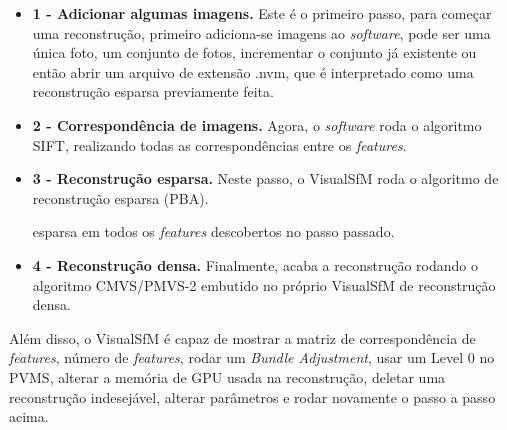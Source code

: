 \begin{itemize}
\item \textbf{1 - Adicionar algumas imagens.} Este é o primeiro passo, para começar uma reconstrução, primeiro adiciona-se imagens ao {\it software}, pode ser uma única foto, um conjunto de fotos, incrementar o conjunto já existente ou então abrir um arquivo de extensão .nvm, que é interpretado como uma reconstrução esparsa previamente feita.

\item \textbf{2 - Correspondência de imagens.} Agora, o {\it software} roda o algoritmo SIFT, realizando todas as correspondências entre os {\it features}.

\item \textbf{3 - Reconstrução esparsa.} Neste passo, o VisualSfM roda o algoritmo de reconstrução esparsa (PBA). %

esparsa em todos os {\it features} descobertos no passo passado.

\item \textbf{4 - Reconstrução densa.} Finalmente, acaba a reconstrução rodando o algoritmo CMVS/PMVS-2 embutido no próprio VisualSfM de reconstrução densa.
\end{itemize}



Além disso, o VisualSfM é capaz de mostrar a matriz de correspondência de {\it features}, número de {\it features}, rodar um {\it Bundle Adjustment}, usar um Level 0 no PVMS, alterar a memória de GPU usada na reconstrução, deletar uma reconstrução indesejável, alterar parâmetros e rodar novamente o passo a passo acima.